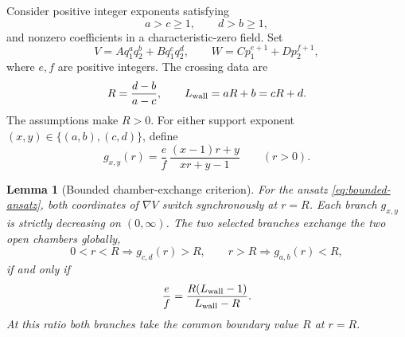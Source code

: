 \documentclass[11pt]{article}
\newtheorem{lemma}[theorem]{Lemma}
\theoremstyle{definition}
\theoremstyle{remark}
\begin{document}
Consider positive integer exponents satisfying
\begin{equation}
a>c\geq1,\qquad d>b\geq1,
\label{eq:crossed-exponents}
\end{equation}
and nonzero coefficients in a characteristic-zero field.  Set
\begin{equation}
V=Aq_1^a q_2^b+Bq_1^c q_2^d,\qquad
W=Cp_1^{e+1}+Dp_2^{f+1},
\label{eq:bounded-ansatz}
\end{equation}
where \(e,f\) are positive integers.  The crossing data are
\begin{equation}
R=\frac{d-b}{a-c},\qquad
L_{\mathrm{wall}}=aR+b=cR+d.
\label{eq:R-Lwall}
\end{equation}
The assumptions make \(R>0\).  For either support exponent
\((x,y)\in\{(a,b),(c,d)\}\), define
\begin{equation}
g_{x,y}(r)=\frac ef\,
\frac{(x-1)r+y}{xr+y-1}\qquad(r>0).
\label{eq:gxy}
\end{equation}

\begin{lemma}[Bounded chamber-exchange criterion]
\label{lem:bounded-criterion}
For the ansatz \eqref{eq:bounded-ansatz}, both coordinates of \(\nabla V\)
switch synchronously at \(r=R\).  Each branch \(g_{x,y}\) is strictly
decreasing on \((0,\infty)\).  The two selected branches exchange the two
open chambers globally,
\begin{equation}
0<r<R\Longrightarrow g_{c,d}(r)>R,
\qquad
r>R\Longrightarrow g_{a,b}(r)<R,
\label{eq:global-exchange}
\end{equation}
if and only if
\begin{equation}
\frac ef=\frac{R(L_{\mathrm{wall}}-1)}{L_{\mathrm{wall}}-R}.
\label{eq:ratio-iff}
\end{equation}
At this ratio both branches take the common boundary value \(R\) at
\(r=R\).
\end{lemma}
\end{document}
